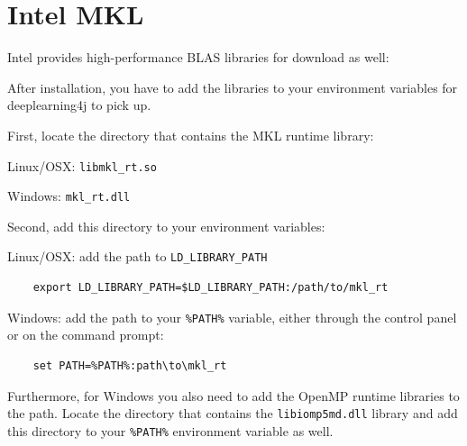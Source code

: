 \documentclass[a4paper]{book}
\begin{document}
\chapter{Intel MKL}
Intel provides high-performance BLAS libraries for download as well\cite{mkl}:

After installation, you have to add the libraries to your environment
variables for deeplearning4j to pick up.

\noindent First, locate the directory that contains the MKL runtime library:
\begin{tight_itemize}
  \item Linux/OSX: \texttt{libmkl\_rt.so}
  \item Windows: \texttt{mkl\_rt.dll}
\end{tight_itemize}

\noindent Second, add this directory to your environment variables:
\begin{tight_itemize}
  \item Linux/OSX: add the path to \texttt{LD\_LIBRARY\_PATH}
    \begin{verbatim}
    export LD_LIBRARY_PATH=$LD_LIBRARY_PATH:/path/to/mkl_rt
    \end{verbatim}
  \item Windows: add the path to your \texttt{\%PATH\%} variable, either
  through the control panel or on the command prompt:
    \begin{verbatim}
    set PATH=%PATH%:path\to\mkl_rt
    \end{verbatim}
\end{tight_itemize}

\noindent Furthermore, for Windows you also need to add the OpenMP runtime
libraries to the path. Locate the directory that contains the
\texttt{libiomp5md.dll} library and add this directory to your \texttt{\%PATH\%}
environment variable as well.


\end{document}
